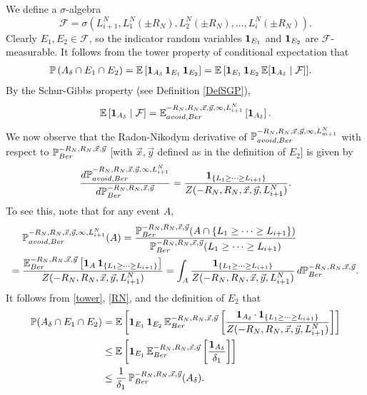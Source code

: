 	We define a $\sigma$-algebra 
	$$\mathcal{F}=\sigma\left(L_{i+1}^N,L_1^N(\pm R_N ), L_2^N(\pm R_N ),\dots, L_i^N(\pm R_N )\right).$$
	Clearly $E_1, E_2\in \mathcal{F}$, so the indicator random variables $\operatorname{\mathbf{1}}_{E_1}$ and $\operatorname{\mathbf{1}}_{E_2}$ are $\mathcal{F}$-measurable. It follows from the tower property of conditional expectation that
	\begin{align}
	\mathbb{P}\left(A_\delta\cap E_1\cap E_2\right)&=\mathbb{E}\left[\operatorname{\mathbf{1}}_{A_\delta} \operatorname{\mathbf{1}}_{E_1} \operatorname{\mathbf{1}}_{E_2}\right] =\mathbb{E}\left[\operatorname{\mathbf{1}}_{E_1} \operatorname{\mathbf{1}}_{E_2}\mathbb{E}[\operatorname{\mathbf{1}}_{A_\delta}\mid \mathcal{F}\right]]. \label{tower}
	\end{align}
	By the Schur-Gibbs property (see Definition \ref{DefSGP}),
	\[
	\mathbb{E}\left[\operatorname{\mathbf{1}}_{A_\delta}\mid \mathcal{F}\right]=\mathbb{E}_{avoid,Ber}^{-R_N,R_N,\vec x, \vec y, \infty, L_{i+1}^N}\left[\operatorname{\mathbf{1}}_{A_\delta}\right].
	\]
	We now observe that the Radon-Nikodym derivative of $\mathbb{P}_{avoid,Ber}^{-R_N,R_N,\vec x, \vec y, \infty, L_{m+1}^N}$ with respect to $\mathbb{P}_{Ber}^{-R_N, R_N,\vec x,\vec y}$ [with $\vec x, \vec y$ defined as in the definition of $E_2$] is given by 
	\begin{equation}
	\frac{d\mathbb{P}_{avoid,Ber}^{-R_N,R_N,\vec x, \vec y, \infty, L_{i+1}^N}}{d\mathbb{P}_{Ber}^{-R_N, R_N,\vec x,\vec y}} = \frac{\operatorname{\mathbf{1}}_{\left\{L_1 \geq \cdots \geq L_{i+1}\right\}}}{Z(-R_N,R_N,\vec x, \vec y, L_{i+1}^N)}. \label{RN}
	\end{equation}
	To see this, note that for any event $A$,
	\begin{align*}
	&\mathbb{P}_{avoid,Ber}^{-R_N,R_N,\vec x, \vec y, \infty, L_{i+1}^N}(A) = \frac{\mathbb{P}_{Ber}^{-R_N,R_N,\vec x, \vec y}(A\cap\left\{L_1 \geq \cdots \geq L_{i+1}\right\})}{\mathbb{P}_{Ber}^{-R_N,R_N,\vec x, \vec y}(L_1\geq\cdots\geq L_{i+1})}\\
	= \; & \frac{\mathbb{E}_{Ber}^{-R_N,R_N,\vec x, \vec y}\left[\operatorname{\mathbf{1}}_A \operatorname{\mathbf{1}}_{\left\{L_1\geq\cdots\geq L_{i+1}\right\}}\right]}{Z(-R_N,R_N,\vec{x},\vec{y},L^N_{i+1})} = \int_A \frac{\operatorname{\mathbf{1}}_{\left\{L_1\geq\cdots\geq L_{i+1}\right\}}}{Z(-R_N,R_N,\vec x, \vec y, L_{i+1}^N)}\,d\mathbb{P}_{Ber}^{-R_N,R_N,\vec x, \vec y}.
	\end{align*}
	It follows from \eqref{tower}, \eqref{RN}, and the definition of $E_2$ that
	\begin{align*}
	\mathbb{P}(A_\delta\cap E_1\cap E_2) &=\mathbb{E}\left[\operatorname{\mathbf{1}}_{E_1}\operatorname{\mathbf{1}}_{E_2} \mathbb{E}_{Ber}^{-R_N, R_N,\vec x,\vec y}\left[\frac{\operatorname{\mathbf{1}}_{A_\delta}\cdot \operatorname{\mathbf{1}}_{\left\{L_1\geq\cdots\geq L_{i+1}\right\}}}{Z(-R_N,R_N,\vec x, \vec y, L_{i+1}^N)}\right]\right]\\
	&\leq \mathbb{E}\left[\operatorname{\mathbf{1}}_{E_1}\mathbb{E}_{Ber}^{-R_N,R_N,\vec x,\vec y}\left[\frac{\operatorname{\mathbf{1}}_{A_\delta}}{\delta_1}\right]\right]\\
	&\leq \frac{1}{\delta_1}\,\mathbb{P}_{Ber}^{-R_N,R_N,\vec x,\vec y}(A_\delta).
	\end{align*}
